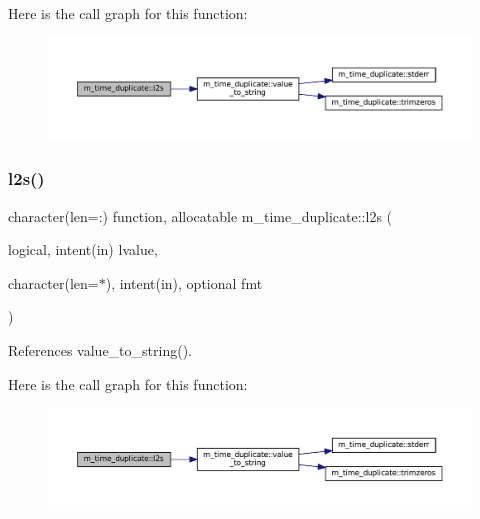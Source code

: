 Here is the call graph for this function\+:\nopagebreak
\begin{figure}[H]
\begin{center}
\leavevmode
\includegraphics[width=350pt]{namespacem__time__duplicate_a7570c5a3b71c4ea4f376a38b285ccbd8_cgraph}
\end{center}
\end{figure}
\mbox{\label{namespacem__time__duplicate_a4bd5e96c3ed16383c576c4e362c16b82}} 
\subsubsection{\texorpdfstring{l2s()}{l2s()}}
{\footnotesize\ttfamily character(len=\+:) function, allocatable m\+\_\+time\+\_\+duplicate\+::l2s (\begin{DoxyParamCaption}\item[{logical, intent(in)}]{lvalue,  }\item[{character(len=$\ast$), intent(in), optional}]{fmt }\end{DoxyParamCaption})}



References value\+\_\+to\+\_\+string().

Here is the call graph for this function\+:\nopagebreak
\begin{figure}[H]
\begin{center}
\leavevmode
\includegraphics[width=350pt]{namespacem__time__duplicate_a4bd5e96c3ed16383c576c4e362c16b82_cgraph}
\end{center}
\end{figure}
\mbox{\label{namespacem__time__duplicate_af8b4555e0c47e2ec327f0434d84b9c56}} 
